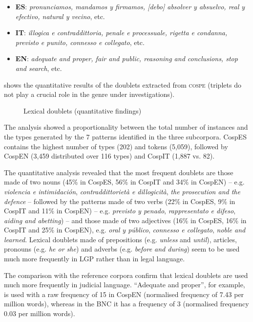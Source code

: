 \documentclass[output=paper]{LSP/langsci}
\begin{document}
\begin{itemize}
\item \textbf{ES}: \textit{pronunciamos, mandamos y firmamos, [debo] absolver y absuelvo, real y efectivo, natural y vecino}, etc.
\item \textbf{IT}: \textit{illogica e contraddittoria, penale e processuale, rigetta e condanna, previsto e punito, connesso e collegato}, etc.
\item \textbf{EN}: \textit{adequate and proper, fair and public, reasoning and conclusions, stop and search}, etc.
\end{itemize}

 shows the quantitative results of the doublets extracted from \textsc{cospe} (triplets do not play a crucial role in the genre under investigations).

\begin{figure}

\caption{Lexical doublets (quantitative findings)} \label{fig:6:2}
\end{figure}

The analysis showed a proportionality between the total number of instances and the types generated by the 7 patterns identified in the three subcorpora. CospES contains the highest number of types (202) and tokens (5,059), followed by CospEN (3,459 distributed over 116 types) and CospIT (1,887 vs. 82).

The quantitative analysis revealed that the most frequent doublets are those made of two nouns (45\% in CospES, 56\% in CospIT and 34\% in CospEN) – e.g. \textit{violencia e intimidación}, \textit{contraddittorietà e dillogicità}, \textit{the prosecution and the defence} – followed by the patterns made of two verbs (22\% in CospES, 9\% in CospIT and 11\% in CospEN) – e.g. \textit{previsto y penado}, \textit{rappresentato e difeso}, \textit{aiding and abetting}) – and those made of two adjectives (16\% in CospES, 16\% in CospIT and 25\% in CospEN), e.g. \textit{oral y público}, \textit{connesso e collegato}, \textit{noble and learned}. Lexical doublets made of prepositions (e.g. \textit{unless} and \textit{until}), articles, pronouns (e.g. \textit{he or she}) and adverbs (e.g. \textit{before and during}) seem to be used much more frequently in LGP rather than in legal language.

The comparison with the reference corpora confirm that lexical doublets are used much more frequently in judicial language. “Adequate and proper”, for example, is used with a raw frequency of 15 in CospEN (normalised frequency of 7.43 per million words), whereas in the BNC it has a frequency of 3 (normalised frequency 0.03 per million words).
\end{document}

